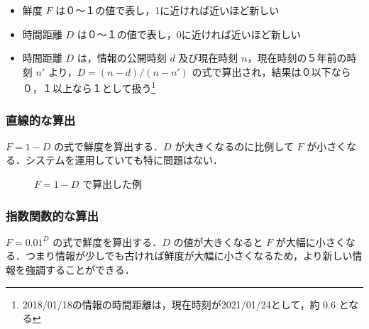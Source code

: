 \begin{itemize}
  \item 鮮度 $F$ は０～１の値で表し，1に近ければ近いほど新しい
  \item 時間距離 $D$ は０～１の値で表し，0に近ければ近いほど新しい
  \item 時間距離 $D$ は，情報の公開時刻 $d$ 及び現在時刻 $n$，現在時刻の５年前の時刻 $n'$ より，$ D =  (n - d) / (n - n') $ の式で算出され，結果は０以下なら０，１以上なら１として扱う\footnote{2018/01/18の情報の時間距離は，現在時刻が2021/01/24として，約 0.6 となる}
\end{itemize}

\subsubsection{直線的な算出}

$ F = 1 - D $ の式で鮮度を算出する．$D$ が大きくなるのに比例して $F$ が小さくなる．システムを運用していても特に問題はない．

\begin{figure}[htbp]
  \begin{center}
  \end{center}
  \caption{$ F = 1 - D $ で算出した例}
\end{figure}

\subsubsection{指数関数的な算出}

$ F =  0.01 ^ D $ の式で鮮度を算出する．$D$ の値が大きくなると $F$ が大幅に小さくなる．つまり情報が少しでも古ければ鮮度が大幅に小さくなるため，より新しい情報を強調することができる．

